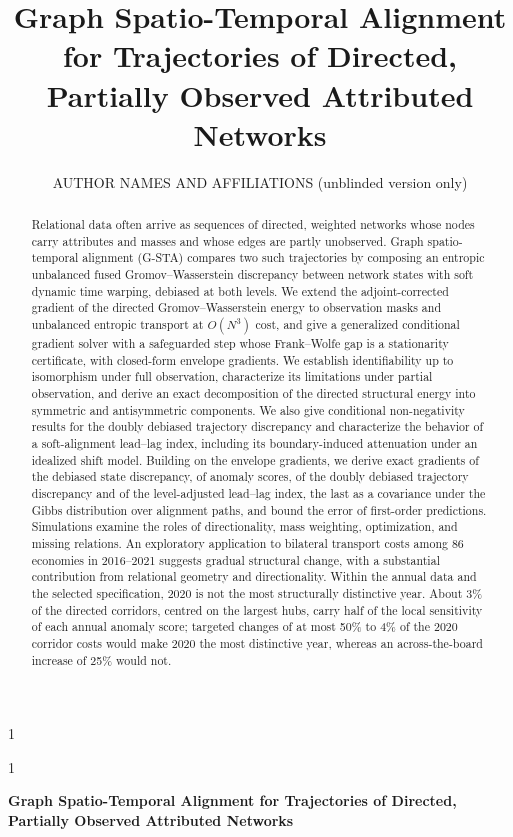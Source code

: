 \documentclass[12pt]{article}
\newcommand{\blind}{1}
\theoremstyle{definition}
\begin{document}
\def\spacingset#1{\renewcommand{\baselinestretch}%
{#1}\small\normalsize} \spacingset{1}

\blind
{
  \title{\bf Graph Spatio-Temporal Alignment for Trajectories of Directed, Partially Observed Attributed Networks}
  \author{AUTHOR NAMES AND AFFILIATIONS (unblinded version only)}
  \maketitle
} \fi

\blind
{
  \bigskip
  \bigskip
  \bigskip
  \begin{center}
    {\LARGE\bf Graph Spatio-Temporal Alignment for Trajectories of Directed, Partially Observed Attributed Networks}
\end{center}
  \medskip
} \fi

\bigskip
\begin{abstract}
Relational data often arrive as sequences of directed, weighted networks whose nodes carry attributes and masses and whose edges are partly unobserved. Graph spatio-temporal alignment (G-STA) compares two such trajectories by composing an entropic unbalanced fused Gromov--Wasserstein discrepancy between network states with soft dynamic time warping, debiased at both levels. We extend the adjoint-corrected gradient of the directed Gromov--Wasserstein energy to observation masks and unbalanced entropic transport at $O(N^3)$ cost, and give a generalized conditional gradient solver with a safeguarded step whose Frank--Wolfe gap is a stationarity certificate, with closed-form envelope gradients. We establish identifiability up to isomorphism under full observation, characterize its limitations under partial observation, and derive an exact decomposition of the directed structural energy into symmetric and antisymmetric components. We also give conditional non-negativity results for the doubly debiased trajectory discrepancy and characterize the behavior of a soft-alignment lead--lag index, including its boundary-induced attenuation under an idealized shift model. Building on the envelope gradients, we derive exact gradients of the debiased state discrepancy, of anomaly scores, of the doubly debiased trajectory discrepancy and of the level-adjusted lead--lag index, the last as a covariance under the Gibbs distribution over alignment paths, and bound the error of first-order predictions.
Simulations examine the roles of directionality, mass weighting, optimization, and missing relations. An exploratory application to bilateral transport costs among 86 economies in 2016--2021 suggests gradual structural change, with a substantial contribution from relational geometry and directionality. Within the annual data and the selected specification, 2020 is not the most structurally distinctive year. About 3\% of the directed corridors, centred on the largest hubs, carry half of the local sensitivity of each annual anomaly score; targeted changes of at most 50\% to 4\% of the 2020 corridor costs would make 2020 the most distinctive year, whereas an across-the-board increase of 25\% would not.
\end{abstract}
\end{document}
